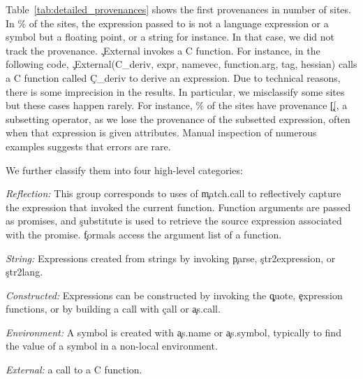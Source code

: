 \documentclass[screen,acmsmall]{acmart}%
\newcommand{\NOTE}[1]{{\it Note: #1}\xspace}
\begin{document}
Table~\ref{tab:detailed_provenances} shows the first provenances in number of sites. In \packagePercentProvenanceSitesd\% of the sites, the expression passed to \eval is not a language expression or a symbol but a floating point, or a string for instance. In that case, we did not track the provenance. \c{.External} invokes a C function. For instance, in the following code, \c{.External(C\_deriv, expr, namevec, function.arg, tag, hessian)} calls a C function called \c{C\_deriv} to derive an expression.
 Due to technical reasons, there is some imprecision in the
results. In particular, we misclassify some sites but these cases happen rarely. For instance,  \packagePercentProvenanceSitesj\% of the sites have provenance \c{[[}, a subsetting operator, as we lose the provenance of the subsetted expression, often when that expression is given attributes. Manual inspection of numerous examples suggests that errors are rare.





 We further classify them into four high-level categories:

\begin{compactitem}[---]
\item {\it Reflection:} This group corresponds to uses of \c{match.call} to
	reflectively capture the expression that invoked the current function. Function arguments are passed as promises, and \c{substitute} is used to retrieve the source
	expression associated with the promise. \c{formals} access the argument list of a function.
\item {\it String:} Expressions created from strings by invoking \c{parse},
	\c{str2expression}, or \c{str2lang}.
\item {\it Constructed:} Expressions can be constructed by invoking the
  \c{quote}, \c{expression} functions, or by building a call with \c{call} or \c{as.call}.
\item {\it Environment: }   A symbol is created with \c{as.name} or \c{as.symbol}, typically to find the value of a symbol in a non-local environment.
\item {\it External: } a call to a C function. %
\end{compactitem}


\end{document}
